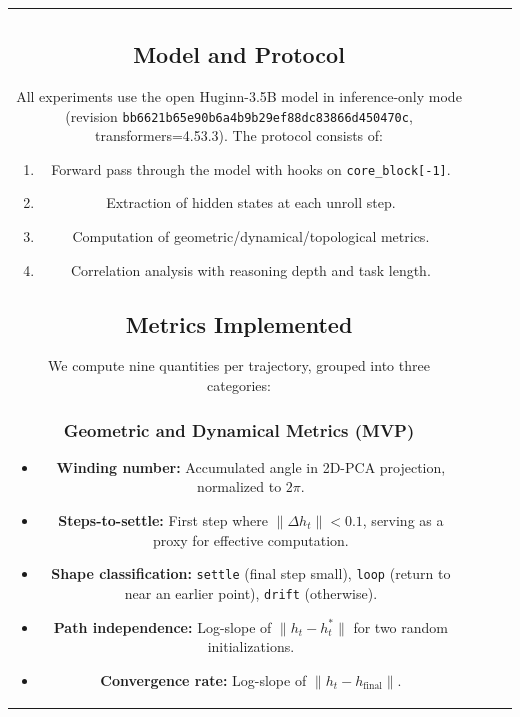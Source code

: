 \begin{table}[h]
\begin{tabular}{cccc}
\subsection{Model and Protocol}

All experiments use the open Huginn-3.5B model \cite{geiping2025scaling} in inference-only mode (revision \texttt{bb6621b65e90b6a4b9b29ef88dc83866d450470c}, transformers=4.53.3). The protocol consists of:

\begin{enumerate}
    \item Forward pass through the model with hooks on \texttt{core\_block[-1]}.
    \item Extraction of hidden states at each unroll step.
    \item Computation of geometric/dynamical/topological metrics.
    \item Correlation analysis with reasoning depth and task length.
\end{enumerate}

\subsection{Metrics Implemented}

We compute nine quantities per trajectory, grouped into three categories:

\subsubsection{Geometric and Dynamical Metrics (MVP)}
\begin{itemize}
    \item \textbf{Winding number:} Accumulated angle in 2D-PCA projection, normalized to $2\pi$.
    \item \textbf{Steps-to-settle:} First step where $\|\Delta h_t\| < 0.1$, serving as a proxy for effective computation.
    \item \textbf{Shape classification:} \texttt{settle} (final step small), \texttt{loop} (return to near an earlier point), \texttt{drift} (otherwise).
    \item \textbf{Path independence:} Log-slope of $\|h_t - h_t^*\|$ for two random initializations.
    \item \textbf{Convergence rate:} Log-slope of $\|h_t - h_{\text{final}}\|$.
\end{itemize}


\end{tabular}
\end{table}
